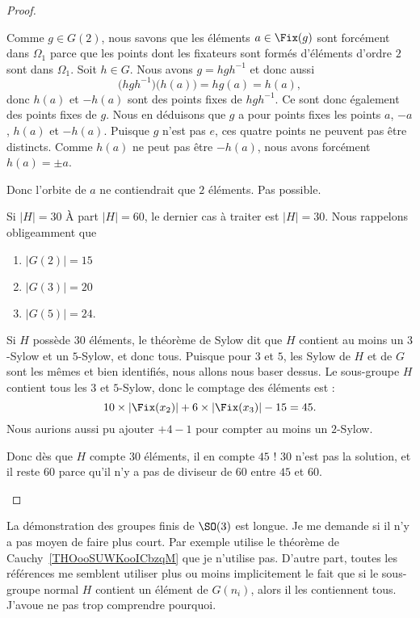 \begin{proof}
\begin{subproof}
		Comme \( g\in G(2)\), nous savons que les éléments \( a\in\Fix(g)\) sont forcément dans \( \Omega_1\) parce que les points dont les fixateurs sont formés d'éléments d'ordre \( 2\) sont dans \( \Omega_1\). Soit \( h\in G\). Nous avons \( g=hgh^{-1}\) et donc aussi
		\begin{equation}
			\big( hgh^{-1} \big)\big( h(a) \big)=hg(a)=h(a),
		\end{equation}
		donc \( h(a)\) et \( -h(a)\) sont des points fixes de \( hgh^{-1}\). Ce sont donc également des points fixes de \( g\). Nous en déduisons que \( g\) a pour points fixes les points \( a\), \( -a\), \( h(a)\) et \( -h(a)\). Puisque \( g\) n'est pas \( e\), ces quatre points ne peuvent pas être distincts. Comme \( h(a)\) ne peut pas être \( -h(a)\), nous avons forcément \( h(a)=\pm a\).

		Donc l'orbite de \( a\) ne contiendrait que \( 2\) éléments. Pas possible.

		\item[Si \( | H |=30\)]
		À part \( | H |=60\), le dernier cas à traiter est \( | H |=30\). Nous rappelons obligeamment que
		\begin{enumerate}
			\item
			      \( | G(2) |=15\)
			\item
			      \( | G(3) |=20\)
			\item
			      \( | G(5) |=24\).
		\end{enumerate}
		Si \( H\) possède \( 30\) éléments, le théorème de Sylow dit que \( H\) contient au moins un \( 3\)-Sylow et un \( 5\)-Sylow, et donc tous. Puisque pour \( 3\) et \( 5\), les Sylow de \( H\) et de \( G\) sont les mêmes et bien identifiés, nous allons nous baser dessus. Le sous-groupe \( H\) contient tous les \( 3\) et \( 5\)-Sylow, donc le comptage des éléments est :
		\begin{equation}
			10\times | \Fix(x_2) |+6\times | \Fix(x_3) |-15=45.
		\end{equation}
		Nous aurions aussi pu ajouter \( +4-1\) pour compter au moins un \( 2\)-Sylow.

		Donc dès que \( H\) compte \( 30\) éléments, il en compte \( 45\) ! \( 30\) n'est pas la solution, et il reste \( 60\) parce qu'il n'y a pas de diviseur de \( 60\) entre \( 45\) et \( 60\).
	\end{subproof}
\end{proof}

\begin{probleme}
	La démonstration des groupes finis de \( \SO(3)\) est longue. Je me demande si il n'y a pas moyen de faire plus court. Par exemple \cite{ooYODPooHeNKiQ} utilise le théorème de Cauchy~\ref{THOooSUWKooICbzqM} que je n'utilise pas. D'autre part, toutes les références me semblent utiliser plus ou moins implicitement le fait que si le sous-groupe normal \( H\) contient un élément de \( G(n_i)\), alors il les contiennent tous. J'avoue ne pas trop comprendre pourquoi.
\end{probleme}

